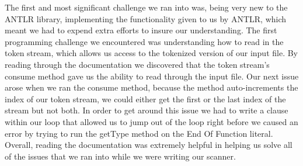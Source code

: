 \documentclass[sigconf]{acmart}
\begin{document}
\newline
The first and most significant challenge we ran into was, being very new to the ANTLR library, implementing the functionality given to us by ANTLR, which meant we had to expend extra efforts to insure our understanding. The first programming challenge we encountered was understanding how to read in the token stream, which allows us access to the tokenized version of our input file. By reading through the documentation we discovered that the token stream's consume method gave us the ability to read through the input file. Our next issue arose when we ran the consume method, because the method auto-increments the index of our token stream, we could either get the first or the last index of the stream but not both. In order to get around this issue we had to write a clause within our loop that allowed us to jump out of the loop right before we caused an error by trying to run the getType method on the End Of Function literal. Overall, reading the documentation was extremely helpful in helping us solve all of the issues that we ran into while we were writing our scanner.
\newpage
\end{document}
